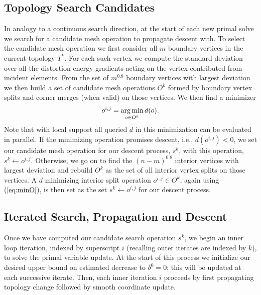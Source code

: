 \subsection{Topology Search Candidates}
In analogy to a continuous search direction, at the start of each new primal solve we search for a candidate mesh operation to propagate descent with. 
%
To select the candidate mesh operation we first consider all $m$ boundary vertices in the current topology $T^k$.  For each such vertex we compute the standard deviation over all the distortion energy gradients acting on the vertex contributed from incident elements. From the set of $m^{0.8}$ boundary vertices with largest deviation we then build a set of candidate mesh operations $O^k$ formed by boundary vertex splits and corner merges (when valid) on those vertices.  We then find a minimizer
\begin{align}
\label{eq:minO}
o^{i,j} = \operatorname*{arg\,min}_{o \in O^k} d(o).
\end{align}
Note that with local support all queried $d$ in this minimization can be evaluated in parallel. If the minimizing operation promises descent, i.e., $d(o^{i,j}) < 0$, we set our candidate mesh operation for our descent process, $s^k$, with this operation, $s^k \leftarrow o^{i,j}$. Otherwise, we go on to find the $(n-m)^{0.8}$ interior vertices with largest deviation and rebuild $O^k$ as the set of all interior vertex splits on those vertices. A $d$ minimizing interior split operation $o^{i,j} \in O^k$, again using (\ref{eq:minO}), is then set as the set $s^k \leftarrow o^{i,j}$ for our descent process.

\subsection{Iterated Search, Propagation and Descent}

Once we have computed our candidate search operation $s^k$, we begin an inner loop iteration, indexed by superscript $i$ (recalling outer iterates are indexed by $k$), to solve the primal variable update. At the start of this process we initialize our desired upper bound on estimated decrease to $\delta^0 = 0$; this will be updated at each successive iterate. Then, each inner iteration $i$ proceeds by first propagating topology change followed by smooth coordinate update. 


